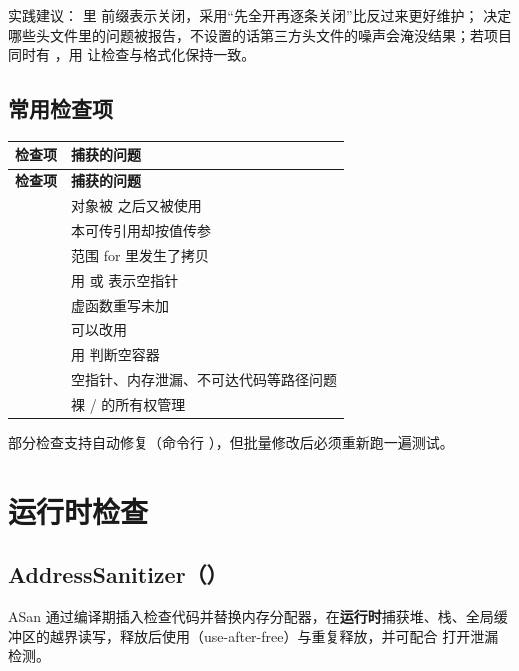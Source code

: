 实践建议： 里 \code{-} 前缀表示关闭，采用“先全开再逐条关闭”比反过来更好维护； 决定哪些头文件里的问题被报告，不设置的话第三方头文件的噪声会淹没结果；若项目同时有 ，用  让检查与格式化保持一致。

\subsection{常用检查项}
\begin{longtable}{L{7.6cm}L{7.4cm}}
\toprule \textbf{检查项} & \textbf{捕获的问题} \\ \midrule
\endfirsthead
\toprule \textbf{检查项} & \textbf{捕获的问题} \\ \midrule
\endhead
\bottomrule \endlastfoot
{} & 对象被  之后又被使用 \\
\allowbreak{} & 本可传引用却按值传参 \\
 & 范围 for 里发生了拷贝 \\
 & 用  或  表示空指针 \\
 & 虚函数重写未加  \\
 & 可以改用  \\
\allowbreak{} & 用  判断空容器 \\
 & 空指针、内存泄漏、不可达代码等路径问题 \\
\allowbreak{} & 裸  /  的所有权管理 \\
\end{longtable}

部分检查支持自动修复（命令行 ），但批量修改后必须重新跑一遍测试。

\section{运行时检查}
\subsection{AddressSanitizer（）}
ASan 通过编译期插入检查代码并替换内存分配器，在\textbf{运行时}捕获堆、栈、全局缓冲区的越界读写，释放后使用（use-after-free）与重复释放，并可配合  打开泄漏检测。

